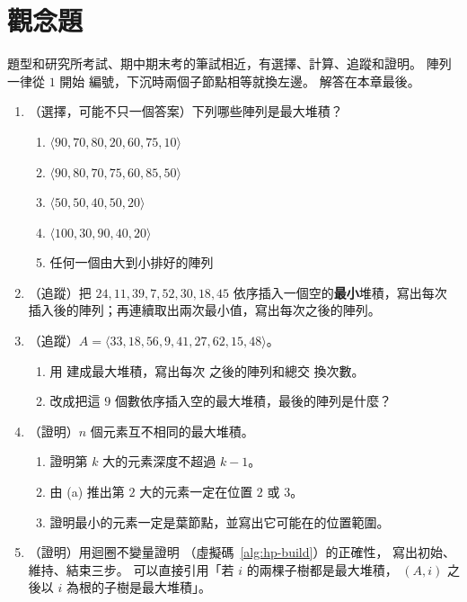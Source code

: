 \section{觀念題}
\label{sec:hp-exercises}

題型和研究所考試、期中期末考的筆試相近，有選擇、計算、追蹤和證明。 陣列一律從 $1$ 開始
編號，下沉時兩個子節點相等就換左邊。 解答在本章最後。

\begin{enumerate}
\item （選擇，可能不只一個答案）下列哪些陣列是最大堆積？
\begin{enumerate}
\item $\langle 90, 70, 80, 20, 60, 75, 10 \rangle$
\item $\langle 90, 80, 70, 75, 60, 85, 50 \rangle$
\item $\langle 50, 50, 40, 50, 20 \rangle$
\item $\langle 100, 30, 90, 40, 20 \rangle$
\item 任何一個由大到小排好的陣列
\end{enumerate}

\item （追蹤）把 $24, 11, 39, 7, 52, 30, 18, 45$ 依序插入一個空的\textbf{最小}堆積，寫出每次
插入後的陣列；再連續取出兩次最小值，寫出每次之後的陣列。

\item （追蹤）$A = \langle 33, 18, 56, 9, 41, 27, 62, 15, 48 \rangle$。
\begin{enumerate}
\item 用  建成最大堆積，寫出每次  之後的陣列和總交
換次數。
\item 改成把這 $9$ 個數依序插入空的最大堆積，最後的陣列是什麼？
\end{enumerate}

\item （證明）$n$ 個元素互不相同的最大堆積。
\begin{enumerate}
\item 證明第 $k$ 大的元素深度不超過 $k - 1$。
\item 由 (a) 推出第 $2$ 大的元素一定在位置 $2$ 或 $3$。
\item 證明最小的元素一定是葉節點，並寫出它可能在的位置範圍。
\end{enumerate}

\item\label{hp-q-build} （證明）用迴圈不變量證明 （虛擬碼~\ref{alg:hp-build}）的正確性，
寫出初始、維持、結束三步。 可以直接引用「若 $i$ 的兩棵子樹都是最大堆積，
$(A, i)$ 之後以 $i$ 為根的子樹是最大堆積」。


\end{enumerate}
